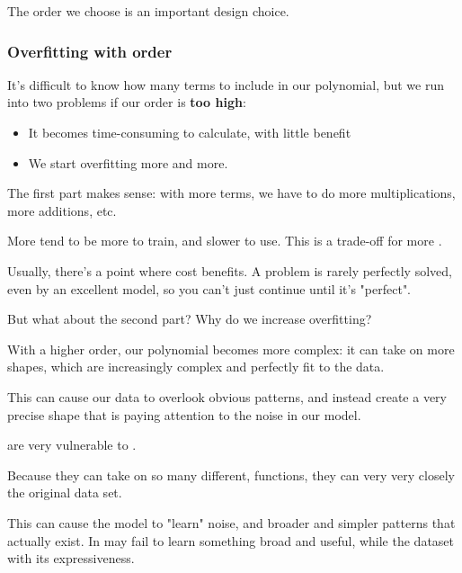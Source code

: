                 \phantom{}

                The order we choose is an important design choice.
                
            \subsecdiv

            \subsubsection{Overfitting with order}
                It's difficult to know how many terms to include in our polynomial, but we run into two problems if our order is \textbf{too high}:

                \begin{itemize}
                    \item It becomes time-consuming to calculate, with little benefit
                    \item We start overfitting more and more.
                \end{itemize}

                The first part makes sense: with more terms, we have to do more multiplications, more additions, etc.\\
                
                \begin{concept}
                    More  tend to be more  to train, and slower to use. This is a trade-off for more . 
                    
                    Usually, there's a point where cost  benefits. A problem is rarely perfectly solved, even by an excellent model, so you can't just continue until it's "perfect".
                \end{concept}

                But what about the second part? Why do we increase overfitting? 

                With a higher order, our polynomial becomes more complex: it can take on more shapes, which are increasingly complex and perfectly fit to the data.

                This can cause our data to overlook obvious patterns, and instead create a very precise shape that is paying attention to the noise in our model.\\

                \begin{concept}
                     are very vulnerable to .

                    Because they can take on so many different,  functions, they can very very closely  the original data set. 
                    
                    This can cause the model to "learn" noise, and  broader and simpler patterns that actually exist. In may fail to learn something broad and useful, while  the dataset with its expressiveness.
                \end{concept}

